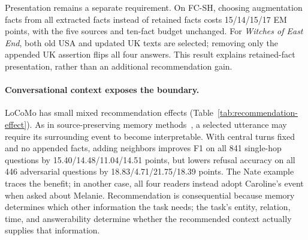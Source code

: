 Presentation remains a separate requirement.
On FC-SH, choosing augmentation facts from all extracted facts instead of retained facts costs 15/14/15/17 EM points, with the five sources and ten-fact budget unchanged.
For \emph{Witches of East End}, both old USA and updated UK texts are selected; removing only the appended UK assertion flips all four answers.
This result explains retained-fact presentation, rather than an additional recommendation gain.

\paragraph{Conversational context exposes the boundary.}
LoCoMo has small mixed recommendation effects (Table~\ref{tab:recommendation-effect}).
As in source-preserving memory methods~\citep{shen-etal-2026-anchormem}, a selected utterance may require its surrounding event to become interpretable.
With central turns fixed and no appended facts, adding neighbors improves F1 on all 841 single-hop questions by 15.40/14.48/11.04/14.51 points, but lowers refusal accuracy on all 446 adversarial questions by 18.83/4.71/21.75/18.39 points.
The Nate example traces the benefit; in another case, all four readers instead adopt Caroline's event when asked about Melanie.
Recommendation is consequential because memory determines which other information the task needs; the task's entity, relation, time, and answerability determine whether the recommended context actually supplies that information.
